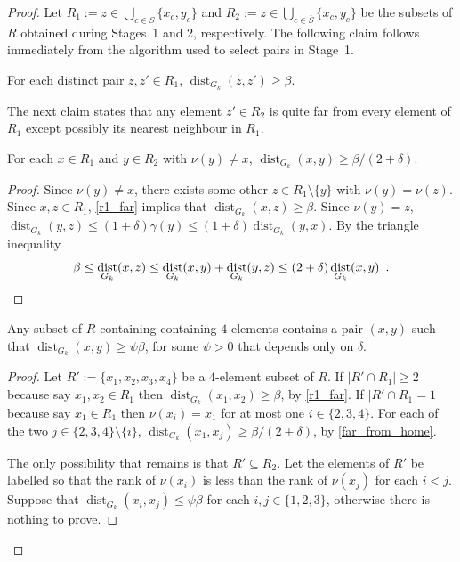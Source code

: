 \documentclass{patmorin}
\DeclareMathOperator{\dist}{dist}
\begin{document}
\begin{proof}
  Let $R_1:=z\in\bigcup_{c\in S}\{x_c,y_c\}$ and $R_2:=z\in\bigcup_{c\in \overline{S}}\{x_c,y_c\}$ be the subsets of $R$ obtained during Stages~1 and 2, respectively. The following claim follows immediately from the algorithm used to select pairs in Stage~1.
  \begin{clm}\label{r1_far}
      For each distinct pair $z,z'\in R_1$, $\dist_{G_k}(z,z')\ge \beta$.
  \end{clm}
  
  The next claim states that any element $z'\in R_2$ is quite far from every element of $R_1$ except possibly its nearest neighbour in $R_1$.
  
  \begin{clm}\label{far_from_home}
    For each $x\in R_1$ and $y\in R_2$ with $\nu(y)\neq x$, $\dist_{G_k}(x,y)\ge \beta /(2+\delta)$.
  \end{clm}

  \begin{proof}
    Since $\nu(y)\neq x$, there exists some other $z\in R_1\setminus\{y\}$ with $\nu(y)=\nu(z)$.  Since $x,z\in R_1$, \cref{r1_far} implies that $\dist_{G_k}(x,z)\ge \beta$.  Since $\nu(y)=z$, $\dist_{G_k}(y, z) \le (1+\delta)\gamma(y)\le (1+\delta)\dist_{G_k}(y, x)$.  By the triangle inequality
    \[ \beta \le \dist_{G_k}(x,z) 
        \le \dist_{G_k}(x,y)+\dist_{G_k}(y,z)
        \le (2+\delta)\dist_{G_k}(x,y) \enspace . \qedhere
    \]
  \end{proof}
  
  
  \begin{clm}
    Any subset of $R$ containing containing $4$ elements contains a pair $(x,y)$ such that $\dist_{G_k}(x,y)\ge \psi\beta$, for some $\psi>0$ that depends only on $\delta$.
  \end{clm}
  
  \begin{proof}
    Let $R':=\{x_1,x_2,x_3,x_4\}$ be a $4$-element subset of $R$.  If $|R'\cap R_1|\ge 2$ because say $x_1,x_2\in R_1$ then $\dist_{G_k}(x_1,x_2)\ge \beta$, by \cref{r1_far}.  If $|R'\cap R_1=1$ because say $x_1\in R_1$ then $\nu(x_i)= x_1$ for at most one $i\in\{2,3,4\}$. For each of the two $j\in\{2,3,4\}\setminus\{i\}$, $\dist_{G_k}(x_1,x_j)\ge \beta/(2+\delta)$, by \cref{far_from_home}.
    
    The only possibility that remains is that $R'\subseteq R_2$. Let the elements of $R'$ be labelled so that the rank of $\nu(x_i)$ is less than the rank of $\nu(x_j)$ for each $i<j$. Suppose that $\dist_{G_k}(x_i,x_j)\le \psi\beta$ for each $i,j\in\{1,2,3\}$, otherwise there is nothing to prove.
    

\end{proof}
\end{proof}
\end{document}
